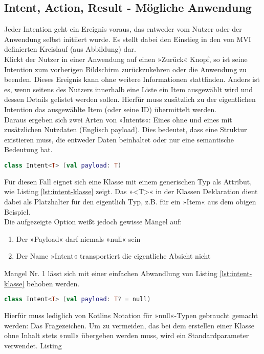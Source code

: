 \subsection{Intent, Action, Result - Mögliche Anwendung}
Jeder Intention geht ein Ereignis voraus, das entweder vom Nutzer oder der Anwendung selbst initiiert wurde. Es stellt dabei den Einstieg in den von MVI definierten Kreislauf (aus Abbildung) dar. 
\\
Klickt der Nutzer in einer Anwendung auf einen »Zurück« Knopf, so ist seine Intention zum vorherigen Bildschirm zurückzukehren oder die Anwendung zu beenden. Dieses Ereignis kann ohne weitere Informationen stattfinden. Anders ist es, wenn seitens des Nutzers innerhalb eine Liste ein Item ausgewählt wird und dessen Details gelistet werden sollen. Hierfür muss zusätzlich zu der eigentlichen Intention das ausgewählte Item (oder seine ID) übermittelt werden.
\\
Daraus ergeben sich zwei Arten von »Intents«: Eines ohne und eines mit zusätzlichen Nutzdaten (Englisch payload). Dies bedeutet, dass eine Struktur existieren muss, die entweder Daten beinhaltet oder nur eine semantische Bedeutung hat.
\begin{lstlisting}[caption={Intent Klasse}, label={lst:intent-klasse}, language=Kotlin]
class Intent<T> (val payload: T)
\end{lstlisting}
\bigskip
Für diesen Fall eignet sich eine Klasse mit einem generischen Typ als Attribut, wie Listing
\ref{lst:intent-klasse}
zeigt. Das »<T>« in der Klassen Deklaration dient dabei als Platzhalter für den eigentlich Typ, z.B. für ein »Item« aus dem obigen Beispiel.
\\
Die aufgezeigte Option weißt jedoch gewisse Mängel auf:
\begin{enumerate}
	\item Der »Payload« darf niemals »null« sein
	\item Der Name »Intent« transportiert die eigentliche Absicht nicht
\end{enumerate}
\bigskip
Mangel Nr. 1 lässt sich mit einer einfachen Abwandlung von Listing
\ref{lst:intent-klasse}
behoben werden. 
\begin{lstlisting}[caption={Intent Klasse}, label={lst:intent-klasse-2}, language=Kotlin]
class Intent<T> (val payload: T? = null)
\end{lstlisting}
\bigskip
Hierfür muss lediglich von Kotlins Notation für »null«-Typen gebraucht gemacht werden: Das Fragezeichen. Um zu vermeiden, das bei dem erstellen einer Klasse ohne Inhalt stets »null« übergeben werden muss, wird ein Standardparameter verwendet. Listing
